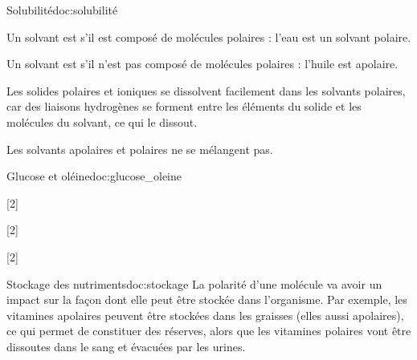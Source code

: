 \begin{doc}{Solubilité}{doc:solubilité}
  \begin{listePoints}
    \item Un solvant est  s'il est composé de molécules polaires : l'eau est un solvant polaire.
    \item Un solvant est  s'il n'est pas composé de molécules polaires : l'huile est apolaire.
  \end{listePoints}
  Les solides polaires et ioniques se dissolvent facilement dans les solvants polaires, car des liaisons hydrogènes se forment entre les éléments du solide et les molécules du solvant, ce qui le dissout.

  Les solvants apolaires et polaires ne se mélangent pas.
\end{doc}

\begin{doc}{Glucose et oléine}{doc:glucose_oleine}
\end{doc}

[2]

[2]

[2]


\begin{doc}{Stockage des nutriments}{doc:stockage}
  La polarité d'une molécule va avoir un impact sur la façon dont elle peut être stockée dans l'organisme.
  Par exemple, les vitamines apolaires peuvent être stockées dans les graisses (elles aussi apolaires), ce qui permet de constituer des réserves, alors que les vitamines polaires vont être dissoutes dans le sang et évacuées par les urines.
\end{doc}